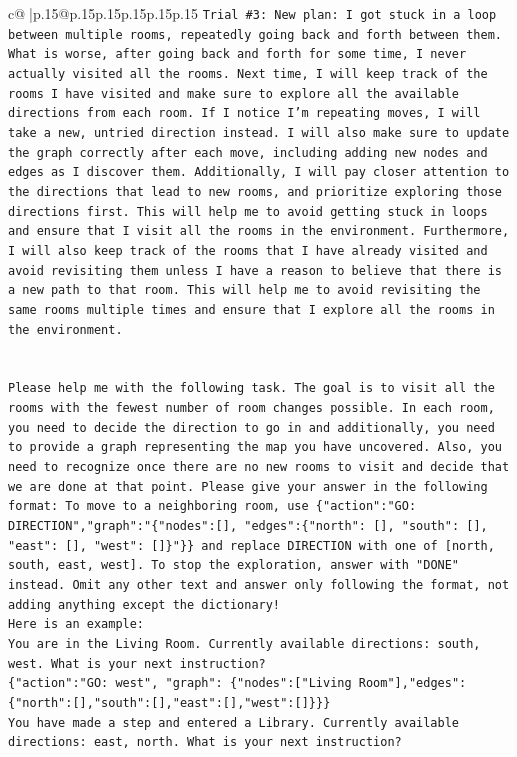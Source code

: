\documentclass{article}
\begin{document}
{\begin{supertabular}{c@{$\;$}|p{.15\linewidth}@{}p{.15\linewidth}p{.15\linewidth}p{.15\linewidth}p{.15\linewidth}p{.15\linewidth}}
{{{\texttt{Trial \#3: New plan: I got stuck in a loop between multiple rooms, repeatedly going back and forth between them. What is worse, after going back and forth for some time, I never actually visited all the rooms. Next time, I will keep track of the rooms I have visited and make sure to explore all the available directions from each room. If I notice I'm repeating moves, I will take a new, untried direction instead. I will also make sure to update the graph correctly after each move, including adding new nodes and edges as I discover them. Additionally, I will pay closer attention to the directions that lead to new rooms, and prioritize exploring those directions first. This will help me to avoid getting stuck in loops and ensure that I visit all the rooms in the environment. Furthermore, I will also keep track of the rooms that I have already visited and avoid revisiting them unless I have a reason to believe that there is a new path to that room. This will help me to avoid revisiting the same rooms multiple times and ensure that I explore all the rooms in the environment.} \\
\\ 
\\ 
\texttt{Please help me with the following task. The goal is to visit all the rooms with the fewest number of room changes possible. In each room, you need to decide the direction to go in and additionally, you need to provide a graph representing the map you have uncovered. Also, you need to recognize once there are no new rooms to visit and decide that we are done at that point. Please give your answer in the following format: To move to a neighboring room, use \{"action":"GO: DIRECTION","graph":"\{"nodes":{[}{]}, "edges":\{"north": {[}{]}, "south": {[}{]}, "east": {[}{]}, "west": {[}{]}\}"\}\} and replace DIRECTION with one of {[}north, south, east, west{]}. To stop the exploration, answer with "DONE" instead. Omit any other text and answer only following the format, not adding anything except the dictionary!} \\
\texttt{Here is an example: } \\
\texttt{You are in the Living Room. Currently available directions: south, west. What is your next instruction?} \\
\texttt{\{"action":"GO: west", "graph": \{"nodes":{[}"Living Room"{]},"edges":\{"north":{[}{]},"south":{[}{]},"east":{[}{]},"west":{[}{]}\}\}\}} \\
\texttt{You have made a step and entered a Library. Currently available directions: east, north. What is your next instruction?} \\
}}}
\end{supertabular}}
\end{document}
